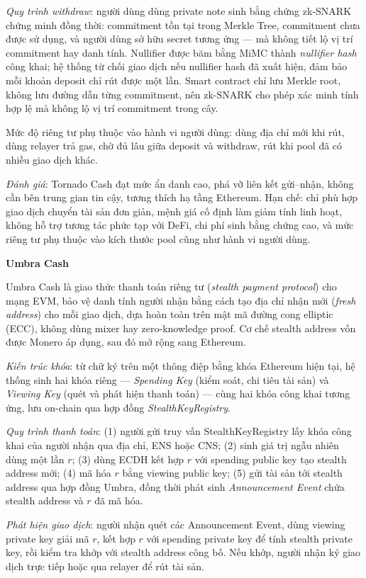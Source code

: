 \documentclass[../DoAn.tex]{subfiles}
\begin{document}
\textit{Quy trình withdraw}: người dùng dùng private note sinh bằng chứng zk-SNARK chứng minh đồng thời: commitment tồn tại trong Merkle Tree, commitment chưa được sử dụng, và người dùng sở hữu secret tương ứng — mà không tiết lộ vị trí commitment hay danh tính. Nullifier được băm bằng MiMC thành \textit{nullifier hash} công khai; hệ thống từ chối giao dịch nếu nullifier hash đã xuất hiện, đảm bảo mỗi khoản deposit chỉ rút được một lần. Smart contract chỉ lưu Merkle root, không lưu đường dẫn từng commitment, nên zk-SNARK cho phép xác minh tính hợp lệ mà không lộ vị trí commitment trong cây.

Mức độ riêng tư phụ thuộc vào hành vi người dùng: dùng địa chỉ mới khi rút, dùng relayer trả gas, chờ đủ lâu giữa deposit và withdraw, rút khi pool đã có nhiều giao dịch khác.

\textit{Đánh giá}: Tornado Cash đạt mức ẩn danh cao, phá vỡ liên kết gửi–nhận, không cần bên trung gian tin cậy, tương thích hạ tầng Ethereum. Hạn chế: chỉ phù hợp giao dịch chuyển tài sản đơn giản, mệnh giá cố định làm giảm tính linh hoạt, không hỗ trợ tương tác phức tạp với DeFi, chi phí sinh bằng chứng cao, và mức riêng tư phụ thuộc vào kích thước pool cũng như hành vi người dùng.

\textbf{Umbra Cash}

Umbra Cash là giao thức thanh toán riêng tư (\textit{stealth payment protocol}) cho mạng EVM, bảo vệ danh tính người nhận bằng cách tạo địa chỉ nhận mới (\textit{fresh address}) cho mỗi giao dịch, dựa hoàn toàn trên mật mã đường cong elliptic (ECC), không dùng mixer hay zero-knowledge proof. Cơ chế stealth address vốn được Monero áp dụng, sau đó mở rộng sang Ethereum.

\textit{Kiến trúc khóa}: từ chữ ký trên một thông điệp bằng khóa Ethereum hiện tại, hệ thống sinh hai khóa riêng — \textit{Spending Key} (kiểm soát, chi tiêu tài sản) và \textit{Viewing Key} (quét và phát hiện thanh toán) — cùng hai khóa công khai tương ứng, lưu on-chain qua hợp đồng \textit{StealthKeyRegistry}.

\textit{Quy trình thanh toán}: (1) người gửi truy vấn StealthKeyRegistry lấy khóa công khai của người nhận qua địa chỉ, ENS hoặc CNS; (2) sinh giá trị ngẫu nhiên dùng một lần $r$; (3) dùng ECDH kết hợp $r$ với spending public key tạo stealth address mới; (4) mã hóa $r$ bằng viewing public key; (5) gửi tài sản tới stealth address qua hợp đồng Umbra, đồng thời phát sinh \textit{Announcement Event} chứa stealth address và $r$ đã mã hóa.

\textit{Phát hiện giao dịch}: người nhận quét các Announcement Event, dùng viewing private key giải mã $r$, kết hợp $r$ với spending private key để tính stealth private key, rồi kiểm tra khớp với stealth address công bố. Nếu khớp, người nhận ký giao dịch trực tiếp hoặc qua relayer để rút tài sản.
\end{document}
